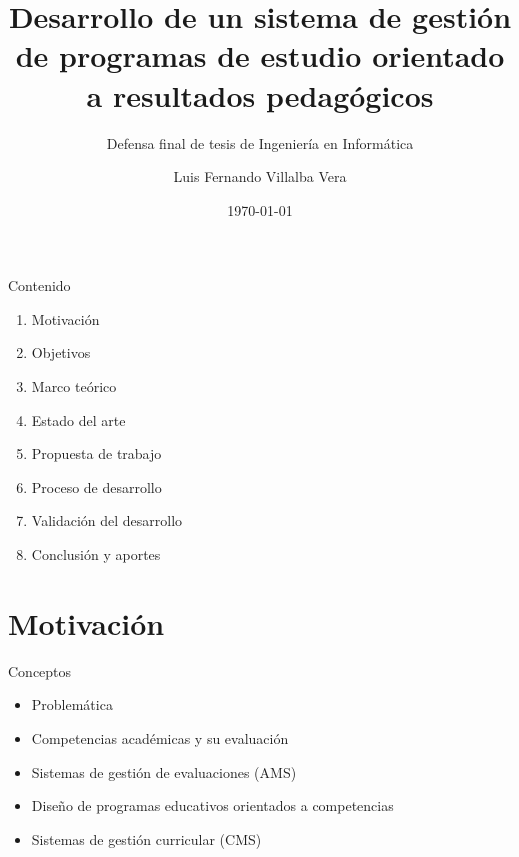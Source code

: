 \documentclass[10pt,xcolor=table ]{beamer}
\title{Desarrollo de un sistema de gestión de programas de estudio orientado a resultados pedagógicos}
\subtitle{Defensa final de tesis de Ingeniería en Informática}
\author{Luis Fernando Villalba Vera}
\institute{Universidad Católica - Nuestra Señora de la Asunción}
\date{\today}
\begin{document}
\maketitle

\begin{frame}{Contenido}
	\begin{enumerate}
	    \item Motivación
	    \item Objetivos
	    \item Marco teórico
	    \item Estado del arte
	    \item Propuesta de trabajo
	    \item Proceso de desarrollo
	    \item Validación del desarrollo
	    \item Conclusión y aportes
	 \end{enumerate}
\end{frame}

\section{Motivación}
\begin{frame}{Conceptos}
  \begin{itemize}[<+- | alert@+>]
    \item Problemática
    \item Competencias académicas y su evaluación
    \item Sistemas de gestión de evaluaciones (AMS)
    \item Diseño de programas educativos orientados a competencias
    \item Sistemas de gestión curricular (CMS)
  \end{itemize}
\end{frame}
\end{document}

